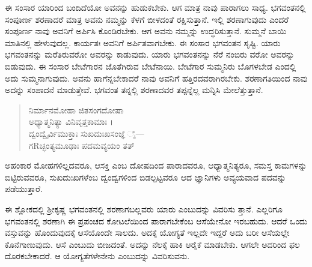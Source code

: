 ಈ ಸಂಸಾರ ಯಾರಿಂದ ಬಂದಿದೆಯೋ ಅವನನ್ನು ಹುಡುಕಬೇಕು. ಆಗ ಮಾತ್ರ ನಾವು ಪಾರಾಗಲು ಸಾಧ್ಯ. ಭಗವಂತನಲ್ಲಿ ಸಂಪೂರ್ಣ ಶರಣಾದರೆ ಮಾತ್ರ ಅವನು ನಮ್ಮನ್ನು ಕೆಳಗೆ ಬೀಳದಂತೆ ರಕ್ಷಿಸುತ್ತಾನೆ. ಇಲ್ಲಿ ಶರಣಾಗುವುದು ಎಂದರೆ ಸಂಪೂರ್ಣ ನಾವು ಅವನಿಗೆ ಅರ್ಪಿಸಿ ಕೊಂಡಿರಬೇಕು. ಆಗ ಅವನು ನಮ್ಮನ್ನು ಉದ್ಧರಿಸುತ್ತಾನೆ. ಸುಮ್ಮನೆ ಬಾಯಿ ಮಾತಿನಲ್ಲಿ ಹೇಳುವುದಲ್ಲ. ಕಾರ್ಯತಃ ಅವನಿಗೆ ಅರ್ಪಿತವಾಗಬೇಕು. ಈ ಸಂಸಾರ ಭಗವಂತನ ಸೃಷ್ಟಿ. ಯಾರು ಭಗವಂತನನ್ನು ಮರೆತಿರುವರೋ ಅವರನ್ನು ಕಾಡುವುದು. ಯಾರು ಭಗವಂತನನ್ನು ನೆರೆ ನಂಬಿರು ವರೋ ಅವರನ್ನು ಬಿಡುವುದು. ಈ ಸಂಸಾರ ಬೇಟೆಗಾರನ ಜೊತೆಗಿರುವ ಬೇಟೆನಾಯಿ. ಬೇಟೆಗಾರ ಸುಮ್ಮನಿರು ಬೊಗಳಬೇಡ ಎಂದಲ್ಲಿ ಅದು ಸುಮ್ಮನಾಗುವುದು. ಅವನು ಹಾಗೆನ್ನಬೇಕಾದರೆ ನಾವು ಅವನಿಗೆ ಹತ್ತಿರದವರಾಗಿರಬೇಕು. ಶರಣಾಗತಿಯಿಂದ ನಾವು ಅದನ್ನು ಸಂಪಾದನೆ ಮಾಡುತ್ತೇವೆ. ಭಗವಂತ ತನ್ನಲ್ಲಿ ಶರಣಾದವರ ತಪ್ಪನ್ನೆಲ್ಲ ಮನ್ನಿಸಿ ಮೇಲೆತ್ತುತ್ತಾನೆ.

\begin{verse}
ನಿರ್ಮಾನಮೋಹಾ ಜಿತಸಂಗದೋಷಾ \\ ಅಧ್ಯಾತ್ಮನಿತ್ಯಾ ವಿನಿವೃತ್ತಕಾಮಾಃ ।\\ದ್ವಂದ್ವೈರ್ವಿಮುಕ್ತಾಃ ಸುಖದುಃಖಸಂಜ್ಞೆ ೈ—\\ ಗRಚ್ಛಂತ್ಯಮೂಢಾಃ ಪದಮವ್ಯಯಂ ತತ್ 
\end{verse}

{\small ಅಹಂಕಾರ ಮೋಹಗಳಿಲ್ಲದವರೂ, ಆಸಕ್ತಿ ಎಂಬ ದೋಷದಿಂದ ಪಾರಾದವರೂ, ಆಧ್ಯಾತ್ಮನಿತ್ಯರೂ, ಸಮಸ್ತ ಕಾಮಗಳನ್ನು ಬಿಟ್ಟಿರುವವರೂ, ಸುಖದುಃಖಗಳೆಂಬ ದ್ವಂದ್ವಗಳಿಂದ ಬಿಡಲ್ಪಟ್ಟವರೂ ಆದ ಜ್ಞಾನಿಗಳು ಅವ್ಯಯವಾದ ಪದವನ್ನು ಪಡೆಯುತ್ತಾರೆ.}

ಈ ಶ್ಲೋಕದಲ್ಲಿ ಶ್ರೀಕೃಷ್ಣ ಭಗವಂತನಲ್ಲಿ ಶರಣಾಗಬಲ್ಲವರು ಯಾರು ಎಂಬುದನ್ನು ವಿವರಿಸು ತ್ತಾನೆ. ಎಲ್ಲರಿಗೂ ಭಗವಂತನಲ್ಲಿ ಶರಣಾಗಿ ಈ ಪ್ರಪಂಚದ ಕೋಟಲೆಯಿಂದ ಪಾರಾಗಬೇಕೆಂಬ ಆಸೆಯೇನೋ ಇರಬಹುದು. ಆದರೆ ಒಂದು ವಸ್ತುವನ್ನು ಹೊಂದುವುದಕ್ಕೆ ಆಸೆಯೊಂದೇ ಸಾಲದು. ಅದಕ್ಕೆ ಯೋಗ್ಯತೆ ಇಲ್ಲದೇ ಇದ್ದರೆ ಅದು ಬರೀ ಆಸೆಯಲ್ಲೇ ಕೊನೆಗಾಣುವುದು. ಆಸೆ ಎಂಬುದು ಬೀಜದಂತೆ. ಅದನ್ನು ನೆಲಕ್ಕೆ ಹಾಕಿ ಆರೈಕೆ ಮಾಡಬೇಕು. ಆಗಲೇ ಅದರಿಂದ ಫಲ ದೊರಕಬೇಕಾದರೆ. ಆ ಯೋಗ್ಯತೆಗಳೇನೇನು ಎಂಬುದನ್ನು ವಿವರಿಸುವನು.

